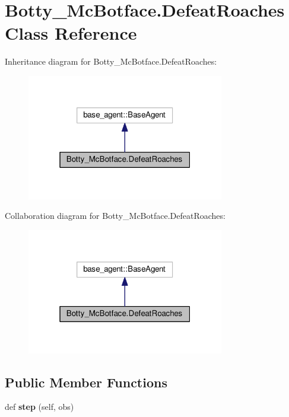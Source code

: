 \hypertarget{classBotty__McBotface_1_1DefeatRoaches}{}\section{Botty\+\_\+\+Mc\+Botface.\+Defeat\+Roaches Class Reference}
\label{classBotty__McBotface_1_1DefeatRoaches}


Inheritance diagram for Botty\+\_\+\+Mc\+Botface.\+Defeat\+Roaches\+:\nopagebreak
\begin{figure}[H]
\begin{center}
\leavevmode
\includegraphics[width=244pt]{classBotty__McBotface_1_1DefeatRoaches__inherit__graph}
\end{center}
\end{figure}


Collaboration diagram for Botty\+\_\+\+Mc\+Botface.\+Defeat\+Roaches\+:\nopagebreak
\begin{figure}[H]
\begin{center}
\leavevmode
\includegraphics[width=244pt]{classBotty__McBotface_1_1DefeatRoaches__coll__graph}
\end{center}
\end{figure}
\subsection*{Public Member Functions}
\begin{DoxyCompactItemize}
\item 
def {\bfseries step} (self, obs)\hypertarget{classBotty__McBotface_1_1DefeatRoaches_ab59843f6730063c2e48834e6edf8ccf3}{}\label{classBotty__McBotface_1_1DefeatRoaches_ab59843f6730063c2e48834e6edf8ccf3}

\end{DoxyCompactItemize}


